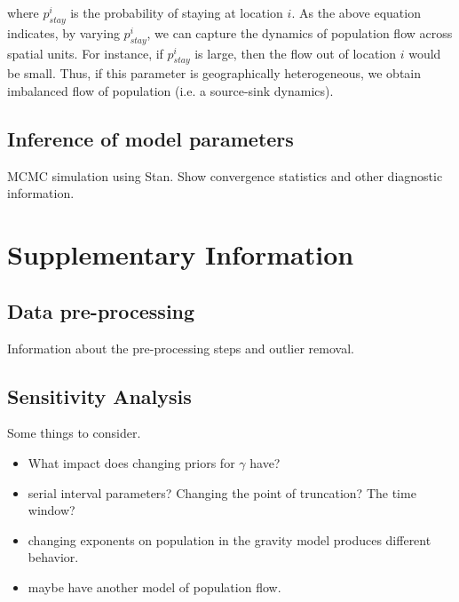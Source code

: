 \documentclass[a4paper,12pt]{article}
\begin{document}
where \(p_{stay}^i\) is the probability of staying at location
\(i\). As the above equation indicates, by varying $p_{stay}^i$, we
can capture the dynamics of population flow across spatial units. For
instance, if \(p_{stay}^i\) is large, then the flow out of location
\(i\) would be small. Thus, if this parameter is geographically
heterogeneous, we obtain imbalanced flow of population (i.e. a source-sink dynamics). 

\subsection{Inference of model parameters}

MCMC simulation using Stan.
Show convergence statistics and other diagnostic information.

\section{Supplementary Information}
\subsection{Data pre-processing}
Information about the pre-processing steps and outlier removal.
\subsection{Sensitivity Analysis}
Some things to consider.
\begin{itemize}
\item What impact does changing priors for $\gamma$ have?
\item serial interval parameters?
  Changing the point of truncation? The time window?
\item changing exponents on population in the gravity model produces
  different behavior.
 \item maybe have another model of population flow.  
\end{itemize}


\end{document}
